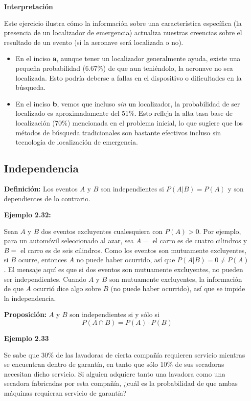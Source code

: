 \documentclass[a4paper]{article}
\begin{document}
\textbf{Interpretación}

Este ejercicio ilustra cómo la información sobre una característica específica (la presencia de un localizador de emergencia) actualiza nuestras creencias sobre el resultado de un evento (si la aeronave será localizada o no).

\begin{itemize}
    \item En el inciso \textbf{a}, aunque tener un localizador generalmente ayuda, existe una pequeña probabilidad (6.67\%) de que aun teniéndolo, la aeronave no sea localizada. Esto podría deberse a fallas en el dispositivo o dificultades en la búsqueda.
    \item En el inciso \textbf{b}, vemos que incluso \textit{sin} un localizador, la probabilidad de ser localizado es aproximadamente del 51\%. Esto refleja la alta tasa base de localización (70\%) mencionada en el problema inicial, lo que sugiere que los métodos de búsqueda tradicionales son bastante efectivos incluso sin tecnología de localización de emergencia.
\end{itemize}



\subsection{Independencia}

\textbf{Definición:}
Los eventos $A$ y $B$ son independientes si $P(A | B) = P(A)$ y son dependientes de lo contrario.


\textbf{Ejemplo 2.32:}

Sean $A$ y $B$ dos eventos excluyentes cualesquiera con $P(A) > 0$. Por ejemplo, para un automóvil seleccionado al azar, sea $A =$ {el carro es de cuatro cilindros} y $B =$ {el carro es de seis cilindros}. Como los eventos son mutuamente excluyentes, si $B$ ocurre, entonces $A$ no puede haber ocurrido, así que $P(A | B) = 0 \neq P(A)$. El mensaje aquí es que si dos eventos son mutuamente excluyentes, no pueden ser independientes. Cuando $A$ y $B$ son mutuamente excluyentes, la información de que $A$ ocurrió dice algo sobre $B$ (no puede haber ocurrido), así que se impide la independencia.

\textbf{Proposición:}
$A$ y $B$ son independientes si y sólo si
$$ P(A \cap B) = P(A) \cdot P(B) $$

\textbf{Ejemplo 2.33}

Se sabe que 30\% de las lavadoras de cierta compañía requieren servicio mientras se encuentran dentro de garantía, en tanto que sólo 10\% de sus secadoras necesitan dicho servicio. Si alguien adquiere tanto una lavadora como una secadora fabricadas por esta compañía, ¿cuál es la probabilidad de que ambas máquinas requieran servicio de garantía?
\end{document}
